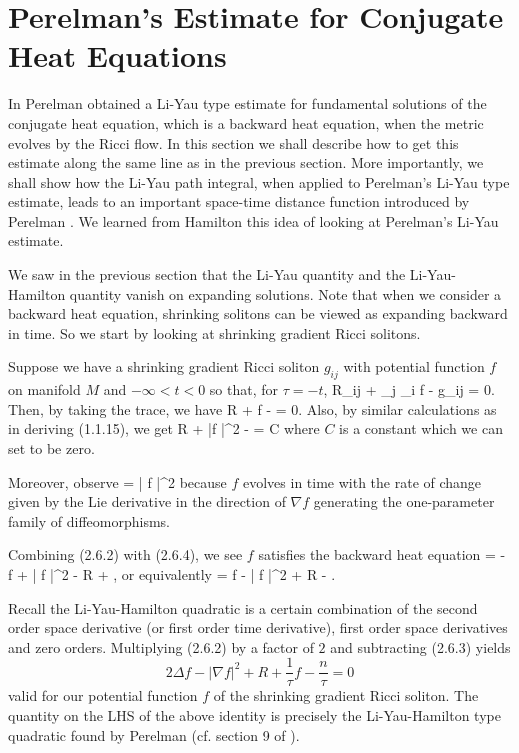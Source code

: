 \section{Perelman's Estimate for Conjugate Heat Equations}

In \cite{P1} Perelman obtained a Li-Yau type estimate for
fundamental solutions of the conjugate heat equation, which is a
backward heat equation, when the metric evolves by the Ricci flow.
In this section we shall describe how to get this estimate along
the same line as in the previous section. More importantly, we
shall show how the Li-Yau path integral, when applied to
Perelman's Li-Yau type estimate, leads to an important space-time
distance function introduced by Perelman \cite{P1}. We learned
from Hamilton \cite{HaL} this idea of looking at Perelman's Li-Yau
estimate.

We saw in the previous section that the Li-Yau quantity and the
Li-Yau-Hamilton quantity vanish on expanding solutions. Note that
when we consider a backward heat equation, shrinking solitons can
be viewed as expanding backward in time. So we start by looking at
shrinking gradient Ricci solitons.

Suppose we have a shrinking gradient Ricci soliton $g_{ij}$ with
potential function $f$ on manifold $M$ and $- \infty < t < 0$ so
that, for $\tau = -t$, \be R_{ij} + \nabla_j \nabla_i f -
 g_{ij} = 0.
\ee Then, by taking the trace, we have \be
R + \Delta f -  = 0. %
\ee Also, by similar calculations as in deriving (1.1.15), we get
\be
R + |\nabla f |^2 -  = C %
\ee where $C$ is a constant which we can set to be zero.

Moreover, observe \be
{} = | \nabla f |^2 %
\ee because $f$ evolves in time with the rate of change given by
the Lie derivative in the direction of $\nabla f$ generating the
one-parameter family of diffeomorphisms.

Combining (2.6.2) with (2.6.4), we see $f$ satisfies the backward
heat equation \be {} = - \Delta f + |
\nabla f |^2 - R
+ , %
\ee or equivalently \be {} = \Delta
f - | \nabla f |^2 +
R - . %
\ee

Recall the Li-Yau-Hamilton quadratic is a certain combination of
the second order space derivative (or first order time
derivative), first order space derivatives and zero orders.
Multiplying (2.6.2) by a factor of $2$ and subtracting (2.6.3)
yields
$$
2 \Delta f - | \nabla f |^2 + R + \frac{1}{\tau} f -
\frac{n}{\tau}=0
$$
valid for our potential function $f$ of the shrinking gradient
Ricci soliton. The quantity on the LHS of the above identity is
precisely the Li-Yau-Hamilton type quadratic found by Perelman
(cf. section 9 of \cite{P1}).

